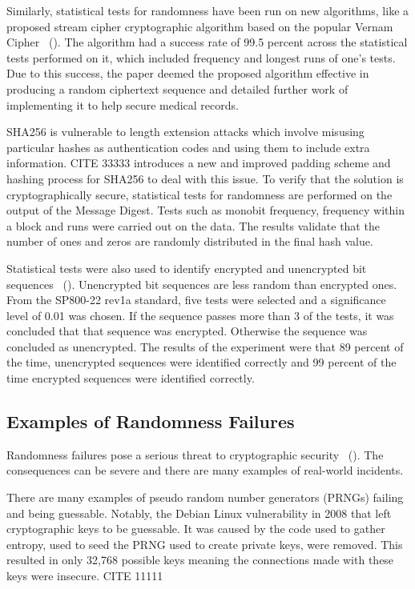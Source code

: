 Similarly, statistical tests for randomness have been run on new algorithms, like a proposed stream cipher cryptographic algorithm based on the popular Vernam Cipher ~(\cite{9232553}). The algorithm had a success rate of 99.5 percent across the statistical tests performed on it, which included frequency and longest runs of one's tests. Due to this success, the paper deemed the proposed algorithm effective in producing a random ciphertext sequence and detailed further work of implementing it to help secure medical records. \newline

SHA256 is vulnerable to length extension attacks which involve misusing particular hashes as authentication codes and using them to include extra information. CITE 33333 introduces a new and improved padding scheme and hashing process for SHA256 to deal with this issue. To verify that the solution is cryptographically secure, statistical tests for randomness are performed on the output of the Message Digest. Tests such as monobit frequency, frequency within a block and runs were carried out on the data. The results validate that the number of ones and zeros are randomly distributed in the final hash value. \newline

Statistical tests were also used to identify encrypted and unencrypted bit sequences ~(\cite{7406118}). Unencrypted bit sequences are less random than encrypted ones. From the SP800-22 rev1a standard, five tests were selected and a significance level of 0.01 was chosen.  If the sequence passes more than 3 of the tests, it was concluded that that sequence was encrypted. Otherwise the sequence was concluded as unencrypted. The results of the experiment were that 89 percent of the time, unencrypted sequences were identified correctly and 99 percent of the time encrypted sequences were identified correctly. \newline

\subsection{Examples of Randomness Failures}

Randomness failures pose a serious threat to cryptographic security ~(\cite{10.1145/3052973.3053040}). The consequences can be severe and there are many examples of real-world incidents. \newline

There are many examples of pseudo random number generators (PRNGs) failing and being guessable. Notably, the Debian Linux vulnerability in 2008 that left cryptographic keys to be guessable. It was caused by the code used to gather entropy, used to seed the PRNG used to create private keys, were removed. This resulted in only 32,768 possible keys meaning the connections made with these keys were insecure. CITE 11111 \newline


